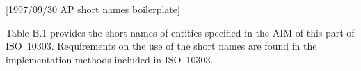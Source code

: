 [1997/09/30 AP short names boilerplate]

  Table B.1 provides the short names of entities specified
in the AIM of this part of ISO~10303. Requirements on the
use of the short names are found in the implementation methods
included in ISO~10303.

\endinput
